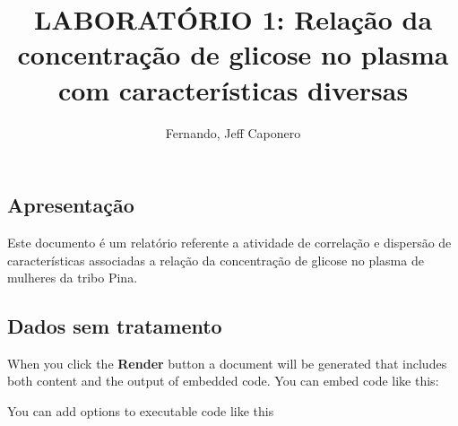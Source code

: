 \documentclass[
  letterpaper,
  DIV=11,
  numbers=noendperiod]{scrartcl}
\title{LABORATÓRIO 1: Relação da concentração de glicose no plasma com
características diversas}
\author{Fernando, Jeff Caponero}
\date{}
\begin{document}
\maketitle
\ifdefined\Shaded\renewenvironment{Shaded}{\begin{tcolorbox}[enhanced, sharp corners, boxrule=0pt, frame hidden, interior hidden, borderline west={3pt}{0pt}{shadecolor}, breakable]}{\end{tcolorbox}}\fi

\hypertarget{apresentauxe7uxe3o}{%
\subsection{Apresentação}\label{apresentauxe7uxe3o}}

Este documento é um relatório referente a atividade de correlação e
dispersão de características associadas a relação da concentração de
glicose no plasma de mulheres da tribo Pina.

\hypertarget{dados-sem-tratamento}{%
\subsection{Dados sem tratamento}\label{dados-sem-tratamento}}

When you click the \textbf{Render} button a document will be generated
that includes both content and the output of embedded code. You can
embed code like this:

You can add options to executable code like this
\end{document}
